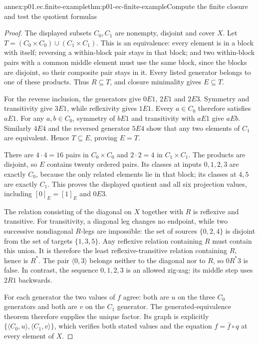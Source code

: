 \begin{annexitem}{annex:p01.ec.finite-example}{thm:p01-ec-finite-example}{Compute the finite closure and test the quotient formulas}
\begin{proof}
The displayed subsets \(C_0,C_1\) are nonempty, disjoint and
cover \(X\). Let \(T=(C_0\times C_0)\cup(C_1\times C_1)\).
This is an equivalence: every element is in a block with itself;
reversing a within-block pair stays in that block; and two
within-block pairs with a common middle element must use the same
block, since the blocks are disjoint, so their composite pair stays
in it. Every listed generator belongs to one of these products.
Thus \(R\subseteq T\), and closure minimality gives \(E\subseteq T\).

For the reverse inclusion, the generators give \(0E1\), \(2E1\)
and \(2E3\). Symmetry and transitivity give \(3E1\), while
reflexivity gives \(1E1\). Every \(a\in C_0\) therefore satisfies
\(aE1\). For any \(a,b\in C_0\), symmetry of \(bE1\) and
transitivity with \(aE1\) give \(aEb\). Similarly \(4E4\)
and the reversed generator \(5E4\) show that any two elements of
\(C_1\) are equivalent. Hence \(T\subseteq E\), proving \(E=T\).

There are \(4\cdot4=16\) pairs in \(C_0\times C_0\) and
\(2\cdot2=4\) in \(C_1\times C_1\). The products are disjoint,
so \(E\) contains twenty ordered pairs. Its classes at inputs
\(0,1,2,3\) are exactly \(C_0\), because the only related
elements lie in that block; its classes at \(4,5\) are exactly
\(C_1\). This proves the displayed quotient and all six projection
values, including \([0]_E=[1]_E\) and \(0E3\).

The relation consisting of the diagonal on \(X\) together with
\(R\) is reflexive and transitive. For transitivity, a diagonal
leg changes no endpoint, while two successive nondiagonal \(R\)-legs
are impossible: the set of sources \(\{0,2,4\}\) is disjoint
from the set of targets \(\{1,3,5\}\). Any reflexive relation
containing \(R\) must contain this union. It is therefore the
least reflexive-transitive relation containing \(R\), hence is
\(R^*\). The pair \(\langle0,3\rangle\) belongs neither to
the diagonal nor to \(R\), so \(0R^*3\) is false. In contrast,
the sequence \(0,1,2,3\) is an allowed zig-zag: its middle
step uses \(2R1\) backwards.

For each generator the two values of \(f\) agree: both are
\(u\) on the three \(C_0\) generators and both are \(v\)
on the \(C_1\) generator. The generated-equivalence theorem
therefore supplies the unique factor. Its graph is explicitly
\(\{\langle C_0,u\rangle,\langle C_1,v\rangle\}\),
which verifies both stated values and the equation
\(f=\bar f\circ q\) at every element of \(X\).


\end{proof}
\end{annexitem}

